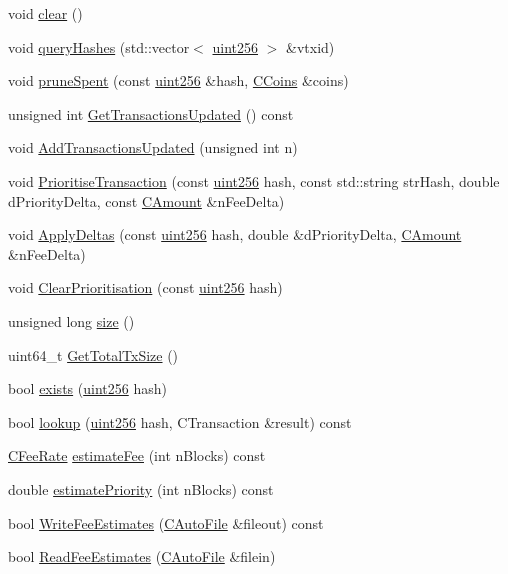 \begin{DoxyCompactItemize}
\item 
void \hyperlink{class_c_tx_mem_pool_a6dba6bce4139392751321438a29b6b09}{clear} ()
\item 
void \hyperlink{class_c_tx_mem_pool_a42fa7d41a45562d02e356f2e7708bb02}{query\+Hashes} (std\+::vector$<$ \hyperlink{classuint256}{uint256} $>$ \&vtxid)
\item 
void \hyperlink{class_c_tx_mem_pool_ad6142b7cd3a58dae6cdaf03551c2f989}{prune\+Spent} (const \hyperlink{classuint256}{uint256} \&hash, \hyperlink{class_c_coins}{C\+Coins} \&coins)
\item 
unsigned int \hyperlink{class_c_tx_mem_pool_a26a5bdb66c9b84f73d1d30fea8e31cc9}{Get\+Transactions\+Updated} () const 
\item 
void \hyperlink{class_c_tx_mem_pool_a3039b67e5eebaa3ff830261c192816f2}{Add\+Transactions\+Updated} (unsigned int n)
\item 
void \hyperlink{class_c_tx_mem_pool_a1a0a00279c941051af1b74c5ebeac40d}{Prioritise\+Transaction} (const \hyperlink{classuint256}{uint256} hash, const std\+::string str\+Hash, double d\+Priority\+Delta, const \hyperlink{amount_8h_a4eaf3a5239714d8c45b851527f7cb564}{C\+Amount} \&n\+Fee\+Delta)
\item 
void \hyperlink{class_c_tx_mem_pool_aa73d1d5a211150fe169d73dc25ba3cdd}{Apply\+Deltas} (const \hyperlink{classuint256}{uint256} hash, double \&d\+Priority\+Delta, \hyperlink{amount_8h_a4eaf3a5239714d8c45b851527f7cb564}{C\+Amount} \&n\+Fee\+Delta)
\item 
void \hyperlink{class_c_tx_mem_pool_a11dea05121ab8321e1d1f1a21ec5c9ac}{Clear\+Prioritisation} (const \hyperlink{classuint256}{uint256} hash)
\item 
unsigned long \hyperlink{class_c_tx_mem_pool_a867f7b452141770f3b2e8697fb3513d8}{size} ()
\item 
uint64\+\_\+t \hyperlink{class_c_tx_mem_pool_ad388f6544c2ca90f1550b06d9d86d54f}{Get\+Total\+Tx\+Size} ()
\item 
bool \hyperlink{class_c_tx_mem_pool_adba06e79be4a1a092dd2db8290733be7}{exists} (\hyperlink{classuint256}{uint256} hash)
\item 
bool \hyperlink{class_c_tx_mem_pool_a8c19232d17e668c6690721b0f5088960}{lookup} (\hyperlink{classuint256}{uint256} hash, C\+Transaction \&result) const 
\item 
\hyperlink{class_c_fee_rate}{C\+Fee\+Rate} \hyperlink{class_c_tx_mem_pool_ae0a5ad226288e4b209c6629328269469}{estimate\+Fee} (int n\+Blocks) const 
\item 
double \hyperlink{class_c_tx_mem_pool_aa30175b2668fcefb3d4f224d38d5732e}{estimate\+Priority} (int n\+Blocks) const 
\item 
bool \hyperlink{class_c_tx_mem_pool_a0a05d7b50b9c2a387182402e60475da6}{Write\+Fee\+Estimates} (\hyperlink{class_c_auto_file}{C\+Auto\+File} \&fileout) const 
\item 
bool \hyperlink{class_c_tx_mem_pool_a0dbbcb6a3b7e1a6c564410668c12cd4f}{Read\+Fee\+Estimates} (\hyperlink{class_c_auto_file}{C\+Auto\+File} \&filein)
\end{DoxyCompactItemize}
